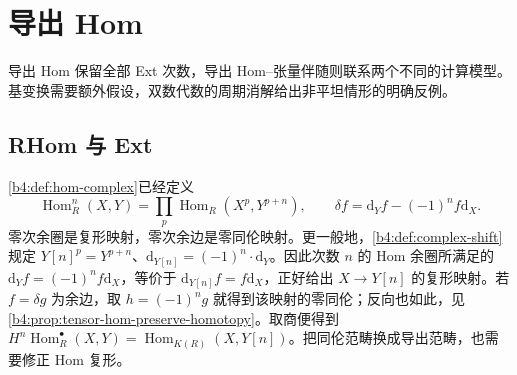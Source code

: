 
\section{导出 Hom}
\label{b4:sec:1803}

导出 Hom 保留全部 Ext 次数，导出 Hom--张量伴随则联系两个不同的计算模型。基变换需要额外假设，双数代数的周期消解给出非平坦情形的明确反例。

%
%

\subsection{RHom 与 Ext}
\label{b4:subsec:1803:01}

\cref{b4:def:hom-complex}已经定义
\[
	\operatorname{Hom}_R^n(X,Y)= \prod_p\operatorname{Hom}_R(X^p,Y^{p+n}),\qquad \delta f=\mathrm{d}_Yf-(-1)^nf\mathrm{d}_X.
\]
零次余圈是复形映射，零次余边是零同伦映射。更一般地，\cref{b4:def:complex-shift}规定 \(Y[n]^p=Y^{p+n}\)、\(\mathrm{d}_{Y[n]}=(-1)^n\cdot\mathrm{d}_Y\)。因此次数 \(n\) 的 Hom 余圈所满足的 \(\mathrm{d}_Yf=(-1)^nf\mathrm{d}_X\)，等价于 \(\mathrm{d}_{Y[n]}f=f\mathrm{d}_X\)，正好给出 \(X\to Y[n]\) 的复形映射。若 \(f=\delta g\) 为余边，取 \(h=(-1)^ng\) 就得到该映射的零同伦；反向也如此，见\cref{b4:prop:tensor-hom-preserve-homotopy}。取商便得到 \(H^n\operatorname{Hom}_R^\bullet(X,Y)=\operatorname{Hom}_{K(R)}(X,Y[n])\)。把同伦范畴换成导出范畴，也需要修正 Hom 复形。

